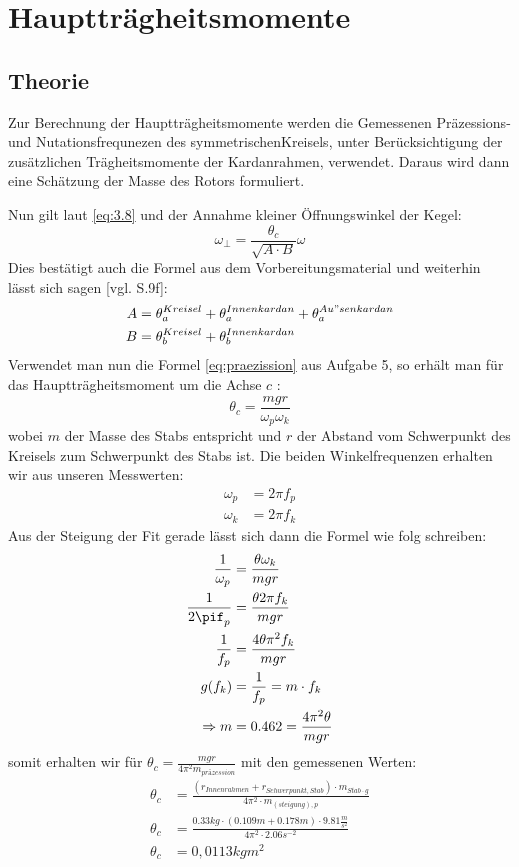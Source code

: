 \documentclass{include/protokollclass}
\begin{document}
    \chapter{Hauptträgheitsmomente}
    
    \section{Theorie}
    Zur Berechnung der Hauptträgheitsmomente werden die Gemessenen Präzessions- und Nutationsfrequnezen des symmetrischenKreisels, unter Berücksichtigung der zusätzlichen Trägheitsmomente der Kardanrahmen, verwendet. Daraus wird dann eine Schätzung der Masse des Rotors formuliert.
    
    Nun gilt laut \eqref{eq:3.8} und der Annahme kleiner Öffnungswinkel der Kegel:
    \begin{equation}\label{eq:tbd}
        \omega_{\perp}=\frac{\theta_c}{\sqrt{A\cdot B}}\omega
    \end{equation}
    Dies bestätigt auch die Formel aus dem Vorbereitungsmaterial und weiterhin lässt sich sagen \cite{PhyPra1}[vgl. S.9f]: 
    \begin{align}
        A&=\theta_{a}^{Kreisel}+\theta_a^{Innenkardan}+\theta_a^{Au"senkardan}\\
        \nonumber B&=\theta_b^{Kreisel}+\theta_b^{Innenkardan}
    \end{align}
    Verwendet man nun die Formel \eqref{eq:praezission} aus Aufgabe 5, so erhält man für das Hauptträgheitsmoment um die Achse $c$ : 
    \begin{equation}
        \theta_c=\frac{mgr}{\omega_p\omega_k}
    \end{equation}
    wobei $m$ der Masse des Stabs entspricht und $r$ der Abstand vom Schwerpunkt des Kreisels zum Schwerpunkt des Stabs ist. Die beiden Winkelfrequenzen erhalten wir aus unseren Messwerten:
    \begin{align}
    \omega_p&=2\pi f_p\\
    \nonumber\omega_k&=2\pi f_k
    \end{align}
    Aus der Steigung der Fit gerade lässt sich dann die Formel wie folg schreiben:
    \begin{align}
    \frac{1}{\omega_p}&=\frac{\theta\omega_k}{mgr}\\
    \nonumber\frac{1}{2\pif_p}&=\frac{\theta2\pi f_k}{mgr}\\
    \nonumber\frac{1}{f_p}&=\frac{4\theta\pi^2f_k}{mgr}\\
        g(f_k)&=\frac{1}{f_p}=m\cdot f_k\\
        \nonumber\Rightarrow m&=0.462=\frac{4\pi^2\theta}{mgr}
    \end{align}
    somit erhalten wir für $\theta_c = \frac{mgr}{4\pi^2 m_{präzession}}$
    mit den gemessenen Werten:
    \begin{align}
        \theta_c&=\frac{(r_{Innenrahmen}+r_{Schwerpunkt,Stab})\cdot m_{Stab\cdot g}}{4\pi^2\cdot m_{(steigung),p}}\\
        \theta_c&=\frac{0.33kg\cdot(0.109m+0.178m)\cdot 9.81\frac{m}{s^2}}{4\pi^2\cdot 2.06 s^{-2}}\\
        \theta_c&=0,0113 kgm^2
    \end{align}
    
\end{document}
